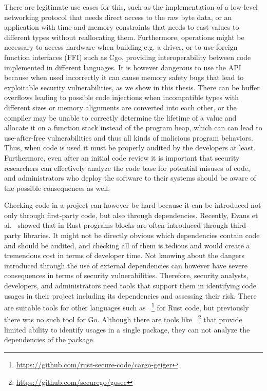There are legitimate use cases for this, such as the implementation of a low-level networking protocol that needs
direct access to the raw byte data, or an application with time and memory constraints that needs to cast values to
different types without reallocating them.
Furthermore, \unsafe{} operations might be necessary to access hardware when building e.g. a driver, or to use
foreign function interfaces (\acrshort{FFI}) such as Cgo, providing interoperability between code implemented in
different languages.
It is however dangerous to use the \unsafe{} \acrshort{API} because when used incorrectly it can cause memory safety
bugs that lead to exploitable security vulnerabilities, as we show in this thesis.
There can be buffer overflows leading to possible code injections when incompatible types with different sizes or
memory alignments are converted into each other, or the compiler may be unable to correctly determine the lifetime of
a value and allocate it on a function stack instead of the program heap, which can can lead to use-after-free
vulnerabilities and thus all kinds of malicious program behaviors.
Thus, when \unsafe{} code is used it must be properly audited by the developers at least.
Furthermore, even after an initial code review it is important that security researchers can effectively analyze the
code base for potential misuses of \unsafe{} code, and administrators who deploy the software to their systems should
be aware of the possible consequences as well.

Checking \unsafe{} code in a project can however be hard because it can be introduced not only through first-party
code, but also through dependencies.
Recently, Evans et al.~\cite{evans2020} showed that in Rust programs \unsafe{} blocks are often introduced through
third-party libraries.
It might not be directly obvious which dependencies contain \unsafe{} code and should be audited, and checking all of
them is tedious and would create a tremendous cost in terms of developer time.
Not knowing about the dangers introduced through the use of external dependencies can however have severe consequences
in terms of security vulnerabilities.
Therefore, security analysts, developers, and administrators need tools that support them in identifying \unsafe{}
code usages in their project including its dependencies and assessing their risk.
There are suitable tools for other languages such as
\toolCargoGeiger{}~\footnote{\url{https://github.com/rust-secure-code/cargo-geiger}} for Rust code, but previously there
was no such tool for Go.
Although there are tools like \toolGosec{}~\footnote{\url{https://github.com/securego/gosec}} that provide limited
ability to identify \unsafe{} usages in a single package, they can not analyze the dependencies of the package.

